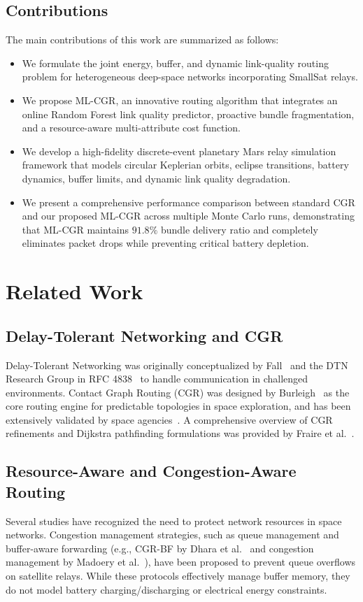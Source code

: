 \documentclass[a4paper,fleqn]{cas-dc}
\newcommand{\mlcgr}{\textsf{ML-CGR}}
\begin{document}
\subsection{Contributions}
The main contributions of this work are summarized as follows:
\begin{itemize}
    \item We formulate the joint energy, buffer, and dynamic link-quality routing problem for heterogeneous deep-space networks incorporating SmallSat relays.
    \item We propose \mlcgr{}, an innovative routing algorithm that integrates an online Random Forest link quality predictor, proactive bundle fragmentation, and a resource-aware multi-attribute cost function.
    \item We develop a high-fidelity discrete-event planetary Mars relay simulation framework that models circular Keplerian orbits, eclipse transitions, battery dynamics, buffer limits, and dynamic link quality degradation.
    \item We present a comprehensive performance comparison between standard CGR and our proposed \mlcgr{} across multiple Monte Carlo runs, demonstrating that \mlcgr{} maintains $91.8\%$ bundle delivery ratio and completely eliminates packet drops while preventing critical battery depletion.
\end{itemize}

\section{Related Work}
\label{sec:related}

\subsection{Delay-Tolerant Networking and CGR}
Delay-Tolerant Networking was originally conceptualized by Fall~\cite{fall2003dtn} and the DTN Research Group in RFC 4838~\cite{cerf2007dtn} to handle communication in challenged environments. Contact Graph Routing (CGR) was designed by Burleigh~\cite{burleigh2010cgr} as the core routing engine for predictable topologies in space exploration, and has been extensively validated by space agencies~\cite{birrane2012ion,segui2011enhancing}. A comprehensive overview of CGR refinements and Dijkstra pathfinding formulations was provided by Fraire et al.~\cite{fraire2021cgr}.

\subsection{Resource-Aware and Congestion-Aware Routing}
Several studies have recognized the need to protect network resources in space networks. Congestion management strategies, such as queue management and buffer-aware forwarding (e.g., CGR-BF by Dhara et al.~\cite{dhara2018cgrbf} and congestion management by Madoery et al.~\cite{madoery2018congestion}), have been proposed to prevent queue overflows on satellite relays. While these protocols effectively manage buffer memory, they do not model battery charging/discharging or electrical energy constraints. 
\end{document}
